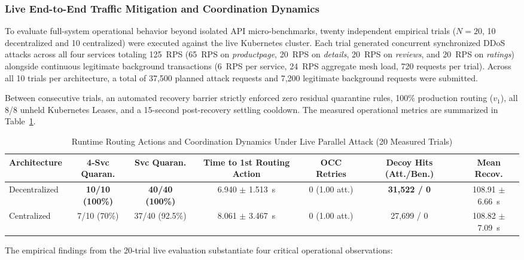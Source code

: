 \subsubsection{Live End-to-End Traffic Mitigation and Coordination Dynamics}
To evaluate full-system operational behavior beyond isolated API micro-benchmarks, twenty independent empirical trials ($N=20$, 10 decentralized and 10 centralized) were executed against the live Kubernetes cluster. Each trial generated concurrent synchronized DDoS attacks across all four services totaling 125~RPS (65~RPS on \textit{productpage}, 20~RPS on \textit{details}, 20~RPS on \textit{reviews}, and 20~RPS on \textit{ratings}) alongside continuous legitimate background transactions (6~RPS per service, 24~RPS aggregate mesh load, 720 requests per trial). Across all 10 trials per architecture, a total of 37,500 planned attack requests and 7,200 legitimate background requests were submitted.

Between consecutive trials, an automated recovery barrier strictly enforced zero residual quarantine rules, 100\% production routing ($v_1$), all 8/8 unheld Kubernetes Leases, and a 15-second post-recovery settling cooldown. The measured operational metrics are summarized in Table~\ref{tab:scenario2_coordination}.

\begin{table}[htbp]
\renewcommand{\arraystretch}{1.2}
\caption{Runtime Routing Actions and Coordination Dynamics Under Live Parallel Attack (20 Measured Trials)}
\label{tab:scenario2_coordination}
\centering
\footnotesize
\setlength{\tabcolsep}{2.5pt}
\begin{tabular}{lcccccc}
\hline
\textbf{Architecture} & \textbf{4-Svc Quaran.} & \textbf{Svc Quaran.} & \textbf{Time to 1st Routing Action} & \textbf{OCC Retries} & \textbf{Decoy Hits (Att./Ben.)} & \textbf{Mean Recov.} \\
\hline
Decentralized & \textbf{10/10 (100\%)} & \textbf{40/40 (100\%)} & 6.940 $\pm$ 1.513~s & 0 (1.00 att.) & \textbf{31,522 / 0} & 108.91 $\pm$ 6.66~s \\
Centralized   & 7/10 (70\%)            & 37/40 (92.5\%)         & 8.061 $\pm$ 3.467~s & 0 (1.00 att.) & 27,699 / 0          & 108.82 $\pm$ 7.09~s \\
\hline
\end{tabular}
\end{table}

The empirical findings from the 20-trial live evaluation substantiate four critical operational observations:

